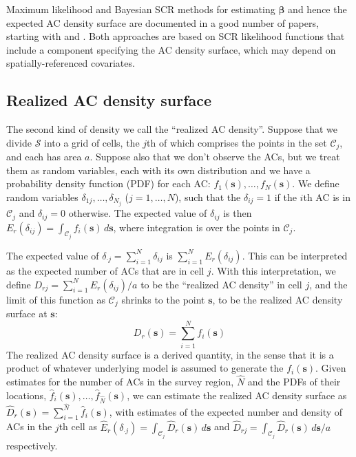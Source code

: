 \documentclass[useAMS,usenatbib,referee]{biom}
\begin{document}
Maximum likelihood and Bayesian SCR methods for estimating $\bm{\beta}$ and hence the expected AC density surface are documented in a good number of papers, starting with \cite{Borchers+Efford:08} and \cite{Royle+Young:08}. Both approaches are based on SCR likelihood functions that include a component specifying the AC density surface, which may depend on spatially-referenced covariates. 

\subsection{Realized AC density surface} \label{s:racd}
 
The second kind of density we call the ``realized AC density''. Suppose that we divide $\mathcal{S}$ into a grid of cells, the $j$th of which comprises the points in the set $\mathcal{C}_j$, and each has area $a$. Suppose also that we don't observe the ACs, but we treat them as random variables, each with its own distribution and we have a probability density function (PDF) for each AC: $f_1(\bm{s}),\ldots,f_N(\bm{s})$. We define random variables $\delta_{1j},\ldots,\delta_{N_j}$ ($j=1,\ldots,N$), such that the $\delta_{ij}=1$ if the $i$th AC is in $\mathcal{C}_j$ and $\delta_{ij}=0$ otherwise. The expected value of $\delta_{ij}$ is then $E_r(\delta_{ij})=\int_{\mathcal{C}_j} f_i(\bm{s}) \, d\bm{s}$, where integration is over the points in $\mathcal{C}_j$.

The expected value of $\delta_{\cdot j}=\sum_{i=1}^N\delta_{ij}$ is $\sum_{i=1}^N E_r(\delta_{ij})$. This can be interpreted as the expected number of ACs that are in cell $j$. With this interpretation, we define $D_{rj} = \sum_{i = 1}^N E_r(\delta_{ij})/a$ to be the ``realized AC density'' in cell $j$, and the limit of this function as $\mathcal{C}_j$ shrinks to the point $\bm{s}$, to be the realized AC density surface at $\bm{s}$:
\begin{equation}
D_r(\bm{s})=\sum_{i=1}^N f_i(\bm{s}) \label{eq:realized-D}
\end{equation}
\noindent
The realized AC density surface is a derived quantity, in the sense that it is a product of whatever underlying model is assumed to generate the $f_i(\bm{s})$. Given estimates for the number of ACs in the survey region, $\widehat{N}$ and the PDFs of their locations, $\widehat{f}_i(\bm{s}),\ldots,\widehat{f}_{\widehat{N}}(\bm{s})$, we can estimate the realized AC density surface as $\widehat{D}_r(\bm{s})=\sum_{i = 1}^{\widehat{N}}\widehat{f}_i(\bm{s})$, with estimates of the expected number and density of ACs in the $j$th cell as $\widehat{E}_r(\delta_{\cdot j})=\int_{\mathcal{C}_j}\widehat{D}_r(\bm{s}) \, d\bm{s}$ and $\widehat{D}_{rj}=\int_{\mathcal{C}_j}\widehat{D}_r(\bm{s})\, d\bm{s}/a$ respectively.
\end{document}
